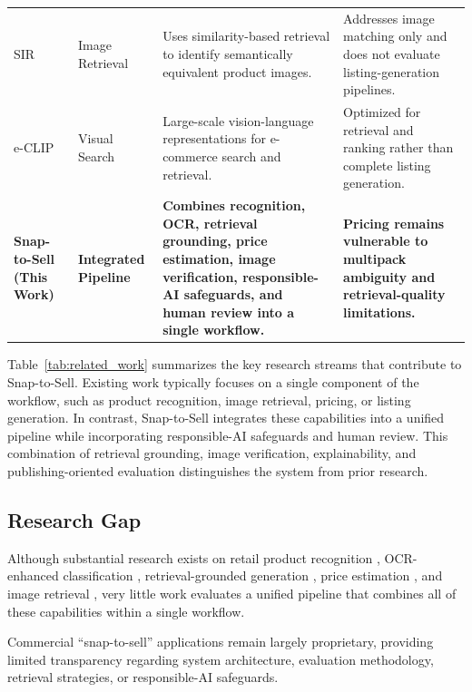 \documentclass[conference]{IEEEtran}
\begin{document}
\begin{table}[t]
\begin{tabular}{p{2.3cm} p{1.8cm} p{4.0cm} p{5.0cm}}
SIR \cite{sir2020}
&
Image Retrieval
&
Uses similarity-based retrieval to identify semantically equivalent product images.
&
Addresses image matching only and does not evaluate listing-generation pipelines.
\\

e-CLIP \cite{eclip2022}
&
Visual Search
&
Large-scale vision-language representations for e-commerce search and retrieval.
&
Optimized for retrieval and ranking rather than complete listing generation.
\\

\textbf{Snap-to-Sell (This Work)}
&
\textbf{Integrated Pipeline}
&
\textbf{Combines recognition, OCR, retrieval grounding, price estimation, image verification, responsible-AI safeguards, and human review into a single workflow.}
&
\textbf{Pricing remains vulnerable to multipack ambiguity and retrieval-quality limitations.}
\\

\hline
\end{tabular}
\end{table}

Table~\ref{tab:related_work} summarizes the key research streams that contribute to Snap-to-Sell. Existing work typically focuses on a single component of the workflow, such as product recognition, image retrieval, pricing, or listing generation. In contrast, Snap-to-Sell integrates these capabilities into a unified pipeline while incorporating responsible-AI safeguards and human review. This combination of retrieval grounding, image verification, explainability, and publishing-oriented evaluation distinguishes the system from prior research.
\subsection{Research Gap}

Although substantial research exists on retail product recognition
\cite{peng2020rp2k,geng2018capg}, OCR-enhanced classification
\cite{ocrfusion2023}, retrieval-grounded generation
\cite{li2024modict}, price estimation \cite{chen2018price,llp2025},
and image retrieval \cite{sir2020,eclip2022}, very little work evaluates
a unified pipeline that combines all of these capabilities within a single
workflow.

Commercial ``snap-to-sell'' applications remain largely proprietary,
providing limited transparency regarding system architecture, evaluation
methodology, retrieval strategies, or responsible-AI safeguards.
\end{document}
